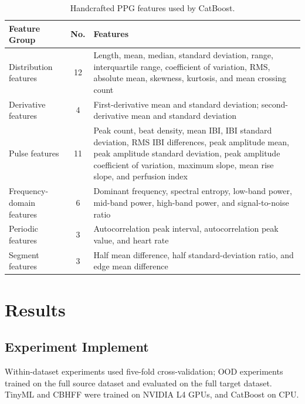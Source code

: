 \documentclass{article}
\begin{document}
\begin{table}[H]
\centering
\caption{Handcrafted PPG features used by CatBoost.}
\label{tab:ppg_features}
\small

\begin{tabular}{p{2.8cm} c p{8.2cm}}
\toprule
\textbf{Feature Group} & \textbf{No.} & \textbf{Features} \\
\midrule

Distribution features 
& 12 
& Length, mean, median, standard deviation, range, interquartile range, coefficient of variation, RMS, absolute mean, skewness, kurtosis, and mean crossing count \\

\midrule

Derivative features 
& 4 
& First-derivative mean and standard deviation; second-derivative mean and standard deviation \\

\midrule

Pulse features 
& 11 
& Peak count, beat density, mean IBI, IBI standard deviation, RMS IBI differences, peak amplitude mean, peak amplitude standard deviation, peak amplitude coefficient of variation, maximum slope, mean rise slope, and perfusion index \\

\midrule

Frequency-domain features 
& 6 
& Dominant frequency, spectral entropy, low-band power, mid-band power, high-band power, and signal-to-noise ratio \\

\midrule

Periodic features 
& 3 
& Autocorrelation peak interval, autocorrelation peak value, and heart rate \\

\midrule

Segment features 
& 3 
& Half mean difference, half standard-deviation ratio, and edge mean difference \\

\bottomrule
\end{tabular}
\end{table}




\section{Results}
\subsection{Experiment Implement}
Within-dataset experiments used five-fold cross-validation; OOD experiments trained on the full source dataset and evaluated on the full target dataset. TinyML and CBHFF were trained on NVIDIA L4 GPUs, and CatBoost on CPU.
\end{document}
